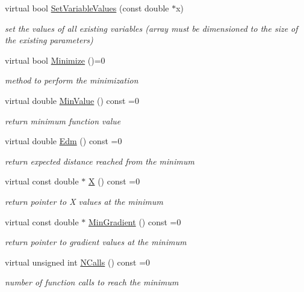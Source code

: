 \begin{DoxyCompactItemize}
virtual bool \mbox{\hyperlink{classROOT_1_1Math_1_1Minimizer_ac8368efbd59da8e0b8bc0a0966309609}{Set\+Variable\+Values}} (const double $\ast$x)
\begin{DoxyCompactList}\small\item\em set the values of all existing variables (array must be dimensioned to the size of the existing parameters) \end{DoxyCompactList}\item 
virtual bool \mbox{\hyperlink{classROOT_1_1Math_1_1Minimizer_a5f6a6307935a17fb13dac1ee7f1c41fd}{Minimize}} ()=0
\begin{DoxyCompactList}\small\item\em method to perform the minimization \end{DoxyCompactList}\item 
virtual double \mbox{\hyperlink{classROOT_1_1Math_1_1Minimizer_ae4845ff42bc0e244fdfa068c53b9a965}{Min\+Value}} () const =0
\begin{DoxyCompactList}\small\item\em return minimum function value \end{DoxyCompactList}\item 
virtual double \mbox{\hyperlink{classROOT_1_1Math_1_1Minimizer_a990c6935849a3fb31aedab1df6c26f28}{Edm}} () const =0
\begin{DoxyCompactList}\small\item\em return expected distance reached from the minimum \end{DoxyCompactList}\item 
virtual const double $\ast$ \mbox{\hyperlink{classROOT_1_1Math_1_1Minimizer_a35c7c2caf54e548f892d84795209edad}{X}} () const =0
\begin{DoxyCompactList}\small\item\em return pointer to X values at the minimum \end{DoxyCompactList}\item 
virtual const double $\ast$ \mbox{\hyperlink{classROOT_1_1Math_1_1Minimizer_a861036d38a21d9a60d44e068397307af}{Min\+Gradient}} () const =0
\begin{DoxyCompactList}\small\item\em return pointer to gradient values at the minimum \end{DoxyCompactList}\item 
virtual unsigned int \mbox{\hyperlink{classROOT_1_1Math_1_1Minimizer_abf8b2e97d47843a1fde7a54cb51c1f0e}{N\+Calls}} () const =0
\begin{DoxyCompactList}\small\item\em number of function calls to reach the minimum \end{DoxyCompactList}\item 

\end{DoxyCompactItemize}
